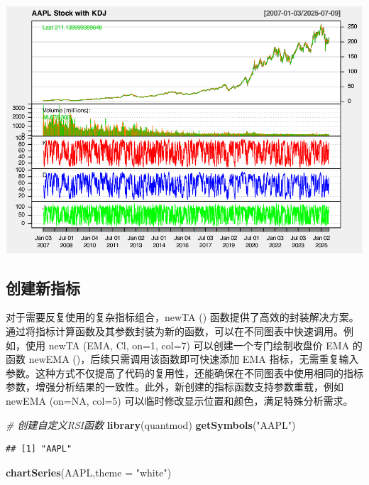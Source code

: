 \documentclass[]{ctexbook}
\newenvironment{Shaded}{\begin{snugshade}}{\end{snugshade}}
\newcommand{\AttributeTok}[1]{\textcolor[rgb]{0.13,0.29,0.53}{#1}}
\newcommand{\CommentTok}[1]{\textcolor[rgb]{0.56,0.35,0.01}{\textit{#1}}}
\newcommand{\FunctionTok}[1]{\textcolor[rgb]{0.13,0.29,0.53}{\textbf{#1}}}
\newcommand{\NormalTok}[1]{#1}
\newcommand{\StringTok}[1]{\textcolor[rgb]{0.31,0.60,0.02}{#1}}
\begin{document}
\includegraphics[width=0.9\linewidth]{quantmod_files/figure-latex/defi-4}

\subsection{创建新指标}\label{ux521bux5efaux65b0ux6307ux6807}

对于需要反复使用的复杂指标组合，newTA () 函数提供了高效的封装解决方案。通过将指标计算函数及其参数封装为新的函数，可以在不同图表中快速调用。例如，使用 newTA (EMA, Cl, on=1, col=7) 可以创建一个专门绘制收盘价 EMA 的函数 newEMA ()，后续只需调用该函数即可快速添加 EMA 指标，无需重复输入参数。这种方式不仅提高了代码的复用性，还能确保在不同图表中使用相同的指标参数，增强分析结果的一致性。此外，新创建的指标函数支持参数重载，例如 newEMA (on=NA, col=5) 可以临时修改显示位置和颜色，满足特殊分析需求。

\begin{Shaded}
\begin{Highlighting}[]
\CommentTok{\# 创建自定义RSI函数}
\FunctionTok{library}\NormalTok{(quantmod)}
\FunctionTok{getSymbols}\NormalTok{(}\StringTok{"AAPL"}\NormalTok{)}
\end{Highlighting}
\end{Shaded}

\begin{verbatim}
## [1] "AAPL"
\end{verbatim}

\begin{Shaded}
\begin{Highlighting}[]
\FunctionTok{chartSeries}\NormalTok{(AAPL,}\AttributeTok{theme =} \StringTok{"white"}\NormalTok{)}
\end{Highlighting}
\end{Shaded}
\end{document}
